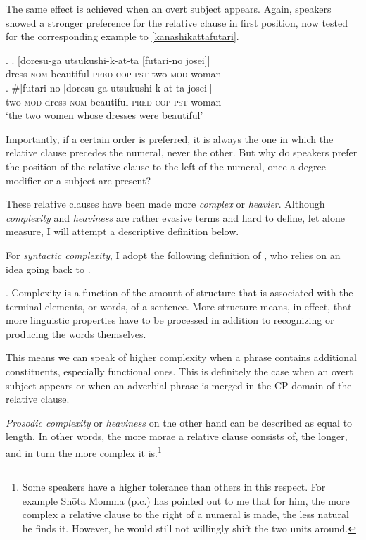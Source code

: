 \documentclass [output=book,colorlinks,citecolor=brown]{langscibook}
\begin{document}
The same effect is achieved when an overt subject appears. Again, speakers showed a stronger preference for the relative clause in first position, now tested for the corresponding example to \ref{kanashikattafutari}.

\ex. \ag. [doresu-ga utsukushi-k-at-ta [futari-no josei]]\\
dress-\textsc{nom} beautiful-\textsc{pred-cop-pst} two-\textsc{mod} woman\\
\bg. \#[futari-no [doresu-ga utsukushi-k-at-ta josei]]\\
two-\textsc{mod} dress-\textsc{nom} beautiful-\textsc{pred-cop-pst} woman\\
`the two women whose dresses were beautiful'

Importantly, if a certain order is preferred, it is always the one in which the relative clause precedes the numeral, never the other. But why do speakers prefer the position of the relative clause to the left of the numeral, once a degree modifier or a subject are present?

These relative clauses have been made more \textit{complex} or \textit{heavier}. Although \textit{complexity} and \textit{heaviness} are rather evasive terms and hard to define, let alone measure, I will attempt a descriptive definition below. %

For \textit{syntactic complexity}, I adopt the following definition of \citet{hawkins:2007:efficiency}, who relies on an idea going back to \citet{miller:1963:finitary}.

\ex. Complexity is a function of the amount of structure that is associated with the terminal elements, or words, of a sentence. More structure means, in effect, that more linguistic properties have to be processed in addition to recognizing or producing the words themselves. \citep[8]{hawkins:2007:efficiency}

This means we can speak of higher complexity when a phrase contains additional constituents, especially functional ones. This is definitely the case when an overt subject appears or when an adverbial phrase is merged in the CP domain of the relative clause. %

\textit{Prosodic complexity} or \textit{heaviness} on the other hand can be described as equal to length. In other words, the more morae a relative clause consists of, the longer, and in turn the more complex it is.\footnote{Some speakers have a higher tolerance than others in this respect. For example Shōta Momma (p.c.) has pointed out to me that for him, the more complex a relative clause to the right of a numeral is made, the less natural he finds it. However, he would still not willingly shift the two units around.}
\end{document}
